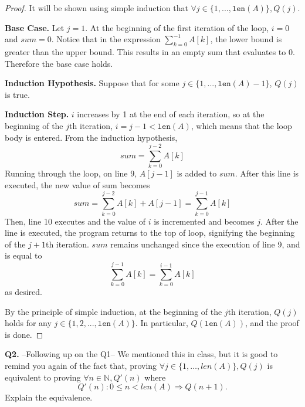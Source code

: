 \documentclass[11pt]{article}
\begin{document}
    \begin{proof}
        It will be shown using simple induction that \(\forall j \in \{1,..., \texttt{len}(A) \},Q(j)\).

        \textbf{Base Case.} Let \(j = 1\). At the beginning of the first iteration of the loop, \(i=0\) and \(sum=0\). Notice that in the expression \(\sum_{k=0} ^{-1} A[k]\), the lower bound is greater than the upper bound. This results in an empty sum that evaluates to \(0\). Therefore the base case holds.

        \textbf{Induction Hypothesis.} Suppose that for some \(j \in \{1,..., \texttt{len}(A) - 1\}\), \(Q(j)\) is true.

        \textbf{Induction Step.} \(i\) increases by 1 at the end of each iteration, so at the beginning of the \(j\)th iteration, \(i = j-1<\texttt{len}(A)\), which means that the loop body is entered. From the induction hypothesis,
        \[
            sum = \sum_{k=0}^{j-2} A[k]
        \]
        Running through the loop, on line 9, \(A[j-1]\) is added to \(sum\). After this line is executed, the new value of sum becomes
        \[
            sum = \sum_{k=0} ^{j-2} A[k] + A[j-1] = \sum_{k=0} ^{j-1} A[k]
        \]
        Then, line 10 executes and the value of \(i\) is incremented and becomes \(j\). After the line is executed, the program returns to the top of loop, signifying the beginning of the \(j+1\)th iteration. \(sum\) remains unchanged since the execution of line 9, and is equal to
        \[
            \sum_{k=0}^{j-1} A[k] = \sum_{k=0}^{i-1} A[k]
        \]
        as desired.

        By the principle of simple induction, at the beginning of the \(j\)th iteration, \(Q(j)\) holds for any \(j \in \{1,2,..., \texttt{len}(A)\}\). In particular, \(Q(\texttt{len}(A))\), and the proof is done.

    \end{proof}
    \pagebreak
    \textbf{Q2.} --Following up on the Q1-- We mentioned this in class, but it is good to remind you again of the fact that, proving $\forall j\in\{1,\ldots,len(A)\}, Q(j)$ is equivalent to proving $\forall n\in\mathbb{N}, Q'(n)$ where $$Q'(n): 0\leq n<len(A) \Rightarrow Q(n+1).$$ Explain the equivalence.
\end{document}
